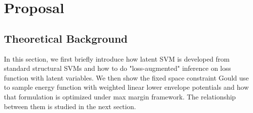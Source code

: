 \documentclass{article}
\begin{document}
	\section{Proposal}
	
	\subsection{Theoretical Background}
	In this section, we first briefly introduce how latent SVM is developed\cite{yu2009learning} from standard structural SVMs and how to do "loss-augmented" inference on loss function with latent variables. We then show the fixed space constraint Gould\cite{gouldlearning} use to sample energy function with weighted linear lower envelope potentials and how that formulation is optimized under max margin framework. The relationship between them is studied in the next section.
\end{document}
